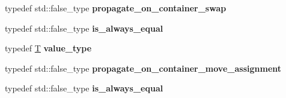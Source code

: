 \begin{DoxyCompactItemize}
typedef std\+::false\+\_\+type {\bfseries propagate\+\_\+on\+\_\+container\+\_\+swap}
\item 
\mbox{\label{structsome__alloc3_a8507fb4590dc6d728bf639d9691af063}} 
typedef std\+::false\+\_\+type {\bfseries is\+\_\+always\+\_\+equal}
\item 
\mbox{\label{structsome__alloc3_a859670f2c07ffe08a8b7c4fdc380b21f}} 
typedef \mbox{\hyperlink{struct_t}{T}} {\bfseries value\+\_\+type}
\item 
\mbox{\label{structsome__alloc3_a31083b642ac1a8adf62f4d0b563f3e0e}} 
typedef std\+::false\+\_\+type {\bfseries propagate\+\_\+on\+\_\+container\+\_\+move\+\_\+assignment}
\item 
\mbox{\label{structsome__alloc3_a8507fb4590dc6d728bf639d9691af063}} 
typedef std\+::false\+\_\+type {\bfseries is\+\_\+always\+\_\+equal}
\end{DoxyCompactItemize}
